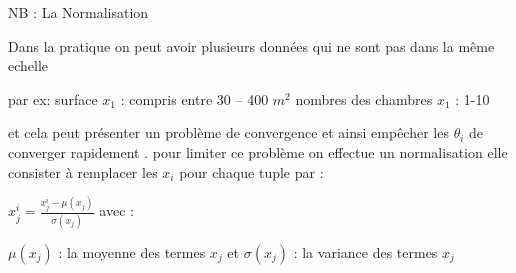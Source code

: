   
  NB :  La Normalisation
  
  Dans la pratique on peut avoir plusieurs données qui ne sont pas dans la même echelle
  
  par ex:
   surface ${x}_{1}$ : compris entre 30 -- 400 ${m}^2$
   nombres des chambres ${x}_{1}$ : 1-10
   
   et cela peut présenter un problème de convergence et ainsi empêcher les ${\theta }_{i}$ de converger rapidement .
   pour limiter ce problème on effectue un normalisation elle consister à remplacer les ${x}_{i}$ pour chaque tuple par :
   
        ${x}_{j}^{i} =  \frac{{x}_{j}^{i}- {\mu({x}_{j})}}{{\sigma({x}_{j})}}$
        avec :
        
        ${\mu({x}_{j})}$ : la moyenne des termes  ${x}_{j}$ et 
        ${\sigma({x}_{j})}$ : la variance des termes  ${x}_{j}$ 
        